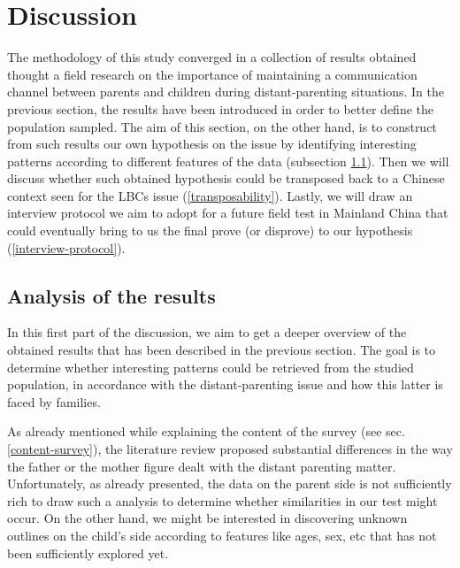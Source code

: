 \section{Discussion}
\label{discussion}

The methodology of this study converged in a collection of results obtained thought a field research on the importance of maintaining a communication channel between parents and children during distant-parenting situations. In the previous section, the results have been introduced in order to better define the population sampled. The aim of this section, on the other hand, is to construct from such results our own hypothesis on the issue by identifying interesting patterns according to different features of the data (subsection \ref{analysis-results}). Then we will discuss whether such obtained hypothesis could be transposed back to a Chinese context seen for the LBCs issue (\ref{transposability}). Lastly, we will draw an interview protocol we aim to adopt for a future field test in Mainland China that could eventually bring to us the final prove (or disprove) to our hypothesis (\ref{interview-protocol}).

\subsection{Analysis of the results}
\label{analysis-results}

In this first part of the discussion, we aim to get a deeper overview of the obtained results that has been described in the previous section. The goal is to determine whether interesting patterns could be retrieved from the studied population, in accordance with the distant-parenting issue and how this latter is faced by families.

As already mentioned while explaining the content of the survey (see sec. \ref{content-survey}), the literature review proposed substantial differences in the way the father or the mother figure dealt with the distant parenting matter. Unfortunately, as already presented, the data on the parent side is not sufficiently rich to draw such a analysis to determine whether similarities in our test might occur. On the other hand, we might be interested in discovering unknown outlines on the child's side according to features like ages, sex, etc that has not been sufficiently explored yet.

